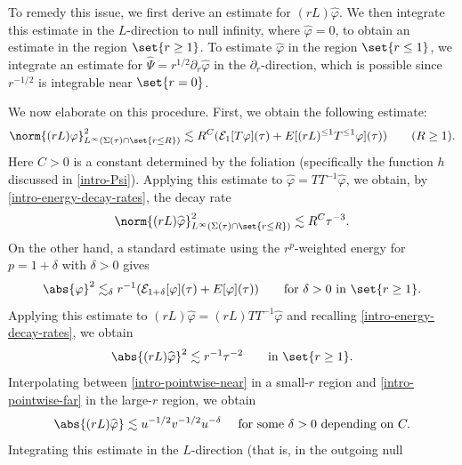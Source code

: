 \documentclass[10pt, reqno]{amsart}
\begin{document}
To remedy this issue, we first derive an estimate for \((rL)\widehat{\varphi{}}\). We
then integrate this estimate in the \(L\)-direction to null infinity, where
\(\widehat{\varphi{}} = 0\), to obtain an estimate in the region \(\set{r\ge
1}\). To estimate \(\widehat{\varphi{}}\) in the region \(\set{r\le 1}\), we
integrate an estimate for \(\widehat{\Psi{}} =
r^{1/2}\partial_r\widehat{\varphi{}}\) in the \(\partial_r\)-direction, which is
possible since \(r^{-1/2}\) is integrable near \(\set{r=0}\).

We now elaborate on this procedure. First, we obtain the following estimate:
\begin{equation}
\norm{(rL)\varphi{}}_{L^\infty(\Sigma{}(\tau{})\cap \set{r\le R})}^2\lesssim R^C(\mathcal{E}_1[T\varphi{}](\tau{}) + E[(rL)^{\le 1}T^{\le 1}\varphi{}](\tau{}))\qquad (R\ge 1).
\end{equation}
Here \(C > 0\) is a constant determined by the foliation (specifically the
function \(h\) discussed in \cref{intro-Psi}). Applying this estimate to
\(\widehat{\varphi{}} = TT^{-1}\widehat{\varphi{}}\), we obtain, by
\cref{intro-energy-decay-rates}, the decay rate
\begin{equation}\label{intro-pointwise-near}
\norm{(rL)\widehat{\varphi{}}}_{L^\infty(\Sigma{}(\tau{})\cap \set{r\le R})}^2\lesssim R^C\tau^{-3}.
\end{equation}
On the other hand, a standard estimate using the \(r^p\)-weighted energy for \(p
= 1 + \delta{}\) with \(\delta{} > 0\) gives
\begin{equation}
\abs{\varphi{}}^2\lesssim_\delta{} r^{-1}(\mathcal{E}_{1+\delta{}}[\varphi{}](\tau{}) + E[\varphi{}](\tau{})) \qquad \textnormal{for }\delta{}>0\textnormal{ in }\set{r\ge 1}.
\end{equation}
Applying this estimate to \((rL)\widehat{\varphi{}} = (rL)TT^{-1}\widehat{\varphi{}}\) and recalling
\cref{intro-energy-decay-rates}, we obtain
\begin{equation}\label{intro-pointwise-far}
\abs{(rL)\widehat{\varphi{}}}^2\lesssim r^{-1}\tau^{-2}\qquad \textnormal{in } \set{r\ge 1}.
\end{equation}
Interpolating between \cref{intro-pointwise-near} in a small-\(r\) region and
\cref{intro-pointwise-far} in the large-\(r\) region, we obtain
\begin{equation}
\abs{(rL)\widehat{\varphi{}}}\lesssim u^{-1/2}v^{-1/2}u^{-\delta{}}\quad \textnormal{ for some }\delta{} > 0\textnormal{ depending on }C.
\end{equation}
Integrating this estimate in the \(L\)-direction (that is, in the outgoing null
\end{document}
